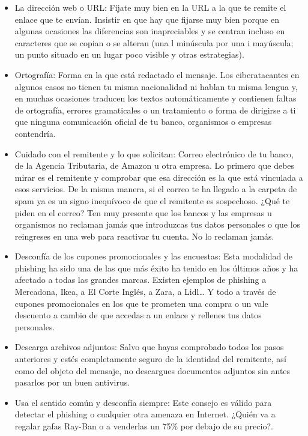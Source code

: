 \documentclass[
  spanish,
  a4paper,
  openany]{book}
\begin{document}
\begin{itemize}
\item
  La dirección web o URL: Fíjate muy bien en la URL a la que te remite el enlace que te envían. Insistir en que hay que fijarse muy bien porque en algunas ocasiones las diferencias son inapreciables y se centran incluso en caracteres que se copian o se alteran (una l minúscula por una i mayúscula; un punto situado en un lugar poco visible y otras estrategias).
\item
  Ortografía: Forma en la que está redactado el mensaje. Los ciberatacantes en algunos casos no tienen tu misma nacionalidad ni hablan tu misma lengua y, en muchas ocasiones traducen los textos automáticamente y contienen faltas de ortografía, errores gramaticales o un tratamiento o forma de dirigirse a ti que ninguna comunicación oficial de tu banco, organismos o empresas contendría.
\item
  Cuidado con el remitente y lo que solicitan: Correo electrónico de tu banco, de la Agencia Tributaria, de Amazon u otra empresa. Lo primero que debes mirar es el remitente y comprobar que esa dirección es la que está vinculada a esos servicios. De la misma manera, si el correo te ha llegado a la carpeta de spam ya es un signo inequívoco de que el remitente es sospechoso. ¿Qué te piden en el correo? Ten muy presente que los bancos y las empresas u organismos no reclaman jamás que introduzcas tus datos personales o que los reingreses en una web para reactivar tu cuenta. No lo reclaman jamás.
\item
  Desconfía de los cupones promocionales y las encuestas: Esta modalidad de phishing ha sido una de las que más éxito ha tenido en los últimos años y ha afectado a todas las grandes marcas. Existen ejemplos de phishing a Mercadona, Ikea, a El Corte Inglés, a Zara, a Lidl\ldots{} Y todo a través de cupones promocionales en los que te prometen una compra o un vale descuento a cambio de que accedas a un enlace y rellenes tus datos personales.
\item
  Descarga archivos adjuntos: Salvo que hayas comprobado todos los pasos anteriores y estés completamente seguro de la identidad del remitente, así como del objeto del mensaje, no descargues documentos adjuntos sin antes pasarlos por un buen antivirus.
\item
  Usa el sentido común y desconfía siempre: Este consejo es válido para detectar el phishing o cualquier otra amenaza en Internet. ¿Quién va a regalar gafas Ray-Ban o a venderlas un 75\% por debajo de su precio?.
\end{itemize}
\end{document}
